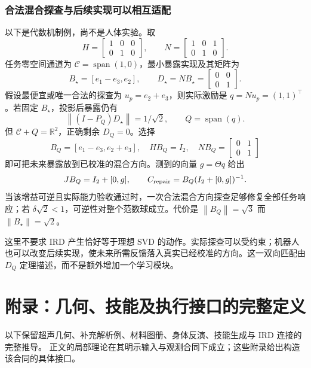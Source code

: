 \documentclass[11pt,a4paper]{article}
\numberwithin{equation}{section}
\theoremstyle{definition}
\newcommand{\R}{\mathbb R}
\newcommand{\norm}[1]{\left\lVert#1\right\rVert}
\begin{document}
\section{合法混合探查与后续实现可以相互适配}
以下是代数机制例，尚不是人体实验。取
\begin{equation}
 H=\begin{bmatrix}1&0&0\\0&1&0\end{bmatrix},\qquad
 N=\begin{bmatrix}1&0&1\\0&1&0\end{bmatrix}.
\end{equation}
任务零空间通道为 $\mathcal C=\operatorname{span}(1,0)$，最小暴露实现及其矩阵为
\begin{equation}
 B_\star=[e_1-e_3,e_2],\qquad
 D_\star=NB_\star=\begin{bmatrix}0&0\\0&1\end{bmatrix}.
\end{equation}
假设最便宜或唯一合法的探查为 $u_p=e_2+e_3$，则实际激励是 $q=Nu_p=(1,1)^\top$。若固定 $B_\star$，投影后暴露仍有
\begin{equation}
 \norm{(I-P_Q)D_\star}=1/\sqrt2,
 \qquad Q=\operatorname{span}(q).
\end{equation}
但 $\mathcal C+Q=\R^2$，正确剩余 $D_Q=0$。选择
\begin{equation}
 B_Q=[e_1-e_3,e_2+e_3],\quad
 HB_Q=I_2,\quad NB_Q=\begin{bmatrix}0&1\\0&1\end{bmatrix}
\end{equation}
即可把未来暴露放到已校准的混合方向。测到的向量 $g=\Theta q$ 给出
\begin{equation}
 JB_Q=I_2+[0,g],\qquad
 C_{\rm repair}=B_Q(I_2+[0,g])^{-1}.
\end{equation}
当该增益可逆且实际能力验收通过时，一次合法混合方向探查足够修复全部任务响应；若 $\delta\sqrt2<1$，可逆性对整个范数球成立。代价是 $\norm{B_Q}=\sqrt3$ 而 $\norm{B_\star}=\sqrt2$。

这里不要求 IRD 产生恰好等于理想 SVD 的动作。实际探查可以受约束；机器人也可以改变后续实现，使未来所需反馈落入真实已经校准的方向。这一双向匹配由 $D_Q$ 定理描述，而不是额外增加一个学习模块。




\clearpage
\appendix
\part*{附录：几何、技能及执行接口的完整定义}
以下保留超声几何、补充解析例、材料图册、身体反演、技能生成与 IRD 连接的完整推导。
正文的局部理论在其明示输入与观测合同下成立；这些附录给出构造该合同的具体接口。
\end{document}
